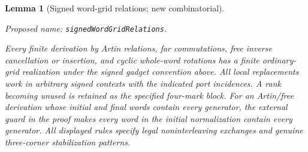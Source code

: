 \documentclass[11pt,a4paper]{article}
\newtheorem{lemma}[theorem]{Lemma}
\theoremstyle{remark}
\newcommand{\formalname}[1]{\leavevmode\par\noindent\textnormal{\small Proposed name: \texttt{#1}.}\par\smallskip}
\begin{document}
\begin{lemma}[Signed word-grid relations; new combinatorial]
\label{lem:signed-relations}
\formalname{signedWordGridRelations}
Every finite derivation by Artin relations, far commutations, free
inverse cancellation or insertion, and cyclic whole-word rotations
has a finite ordinary-grid realization under the signed gadget
convention above.  All local replacements work in arbitrary signed
contexts with the indicated port incidences.  A rank becoming
unused is retained as the specified four-mark block.  For an
Artin/free derivation whose initial and final words contain every
generator, the external guard
in the proof makes every word in the initial normalization contain
every generator.  All displayed rules specify legal noninterleaving
exchanges and genuine three-corner stabilization patterns.
\end{lemma}
\end{document}

